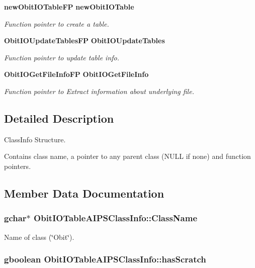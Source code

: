 \begin{CompactItemize}
{\bf new\-Obit\-IOTable\-FP} {\bf new\-Obit\-IOTable}
\begin{CompactList}\small\item\em Function pointer to create a table. \item\end{CompactList}\item 
{\bf Obit\-IOUpdate\-Tables\-FP} {\bf Obit\-IOUpdate\-Tables}
\begin{CompactList}\small\item\em Function pointer to update table info. \item\end{CompactList}\item 
{\bf Obit\-IOGet\-File\-Info\-FP} {\bf Obit\-IOGet\-File\-Info}
\begin{CompactList}\small\item\em Function pointer to Extract information about underlying file. \item\end{CompactList}\end{CompactItemize}


\subsection{Detailed Description}
Class\-Info Structure. 

Contains class name, a pointer to any parent class (NULL if none) and function pointers. 



\subsection{Member Data Documentation}
\subsubsection{\setlength{\rightskip}{0pt plus 5cm}gchar$\ast$ {\bf Obit\-IOTable\-AIPSClass\-Info::Class\-Name}}\label{structObitIOTableAIPSClassInfo_o2}


Name of class (\char`\"{}Obit\char`\"{}). 

\subsubsection{\setlength{\rightskip}{0pt plus 5cm}gboolean {\bf Obit\-IOTable\-AIPSClass\-Info::has\-Scratch}}\label{structObitIOTableAIPSClassInfo_o1}


